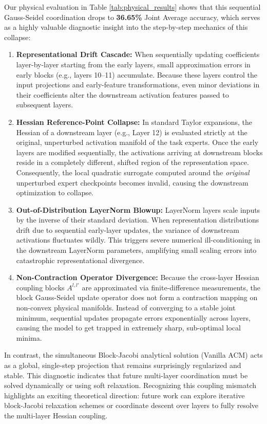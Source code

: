 Our physical evaluation in Table \ref{tab:physical_results} shows that this sequential Gauss-Seidel coordination drops to \textbf{36.65\%} Joint Average accuracy, which serves as a highly valuable diagnostic insight into the step-by-step mechanics of this collapse:
\begin{enumerate}
    \item \textbf{Representational Drift Cascade:} When sequentially updating coefficients layer-by-layer starting from the early layers, small approximation errors in early blocks (e.g., layers 10--11) accumulate. Because these layers control the input projections and early-feature transformations, even minor deviations in their coefficients alter the downstream activation features passed to subsequent layers.
    \item \textbf{Hessian Reference-Point Collapse:} In standard Taylor expansions, the Hessian of a downstream layer (e.g., Layer 12) is evaluated strictly at the original, unperturbed activation manifold of the task experts. Once the early layers are modified sequentially, the activations arriving at downstream blocks reside in a completely different, shifted region of the representation space. Consequently, the local quadratic surrogate computed around the \emph{original} unperturbed expert checkpoints becomes invalid, causing the downstream optimization to collapse.
    \item \textbf{Out-of-Distribution LayerNorm Blowup:} LayerNorm layers scale inputs by the inverse of their standard deviation. When representation distributions drift due to sequential early-layer updates, the variance of downstream activations fluctuates wildly. This triggers severe numerical ill-conditioning in the downstream LayerNorm parameters, amplifying small scaling errors into catastrophic representational divergence.
    \item \textbf{Non-Contraction Operator Divergence:} Because the cross-layer Hessian coupling blocks $A^{l, l'}$ are approximated via finite-difference measurements, the block Gauss-Seidel update operator does not form a contraction mapping on non-convex physical manifolds. Instead of converging to a stable joint minimum, sequential updates propagate errors exponentially across layers, causing the model to get trapped in extremely sharp, sub-optimal local minima.
\end{enumerate}
In contrast, the simultaneous Block-Jacobi analytical solution (Vanilla ACM) acts as a global, single-step projection that remains surprisingly regularized and stable. This diagnostic indicates that future multi-layer coordination must be solved dynamically or using soft relaxation. Recognizing this coupling mismatch highlights an exciting theoretical direction: future work can explore iterative block-Jacobi relaxation schemes or coordinate descent over layers to fully resolve the multi-layer Hessian coupling.

